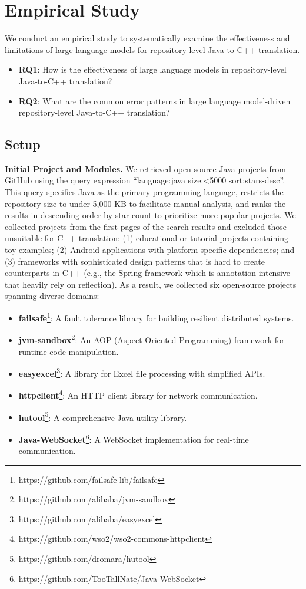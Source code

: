 
\section{Empirical Study}

We conduct an empirical study to systematically examine the effectiveness and limitations of large language models for repository-level Java-to-C++ translation.

\begin{itemize}[leftmargin=*]
\item \textbf{RQ1}: How is the effectiveness of large language models in repository-level Java-to-C++ translation?
\item \textbf{RQ2}: What are the common error patterns in large language model-driven repository-level Java-to-C++ translation?
\end{itemize}

\subsection{Setup}

\textbf{Initial Project and Modules.} We retrieved open-source Java projects from GitHub using the query expression ``language:java size:<5000 sort:stars-desc''. This query specifies Java as the primary programming language, restricts the repository size to under 5,000 KB to facilitate manual analysis, and ranks the results in descending order by star count to prioritize more popular projects. We collected projects from the first  pages of the search results and excluded those unsuitable for C++ translation: (1) educational or tutorial projects containing toy examples; (2) Android applications with platform-specific dependencies; and (3) frameworks with sophisticated design patterns that is hard to create counterparts in C++ (e.g., the Spring framework which is annotation-intensive that heavily rely on reflection). As a result, we collected six open-source projects spanning diverse domains:

\begin{itemize}[leftmargin=*]
\item \textbf{failsafe}\footnote{https://github.com/failsafe-lib/failsafe}: A fault tolerance library for building resilient distributed systems.
\item \textbf{jvm-sandbox}\footnote{https://github.com/alibaba/jvm-sandbox}: An AOP (Aspect-Oriented Programming) framework for runtime code manipulation.
\item \textbf{easyexcel}\footnote{https://github.com/alibaba/easyexcel}: A library for Excel file processing with simplified APIs.
\item \textbf{httpclient}\footnote{https://github.com/wso2/wso2-commons-httpclient}: An HTTP client library for network communication.
\item \textbf{hutool}\footnote{https://github.com/dromara/hutool}: A comprehensive Java utility library.
\item \textbf{Java-WebSocket}\footnote{https://github.com/TooTallNate/Java-WebSocket}: A WebSocket implementation for real-time communication.
\end{itemize}

